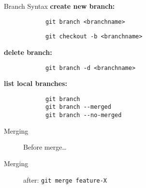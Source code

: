 \begin{frame}[fragile]{Branch Syntax}
    \textbf{create new branch:}
        \begin{lstlisting}
            git branch <branchname>
        \end{lstlisting}
        \begin{lstlisting}
            git checkout -b <branchname>
        \end{lstlisting}
    \textbf{delete branch:}
        \begin{lstlisting}
            git branch -d <branchname>
        \end{lstlisting}
    \textbf{list local branches:}
        \begin{lstlisting}
            git branch
            git branch --merged
            git branch --no-merged
        \end{lstlisting}
\end{frame}

\begin{frame}[fragile]{Merging}
        \begin{figure}
            \centering
            \caption{Before merge\ldots}
        \end{figure}
\end{frame}

\begin{frame}[fragile]{Merging}
    \begin{figure}[b]
        \centering
        \caption{after: \texttt{git merge feature-X}}
    \end{figure}
\end{frame}


